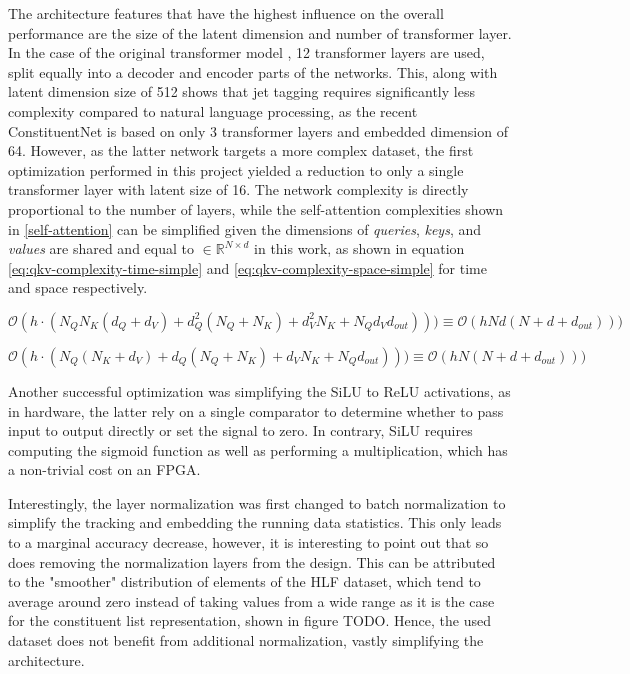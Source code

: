 The architecture features that have the highest influence on the overall performance are the size of the latent dimension and number of transformer layer. In the case of the original transformer model \cite{44-vaswani2017attention}, 12 transformer layers are used, split equally into a decoder and encoder parts of the networks. This, along with latent dimension size of 512 shows that jet tagging requires significantly less complexity compared to natural language processing, as the recent ConstituentNet \cite{3-yuan2021constituentnet:} is based on only 3 transformer layers and embedded dimension of 64. However, as the latter network targets a more complex dataset, the first optimization performed in this project yielded a reduction to only a single transformer layer with latent size of 16. The network complexity is directly proportional to the number of layers, while the self-attention complexities shown in \cref{self-attention} can be simplified given the dimensions of \textit{queries}, \textit{keys}, and \textit{values} are shared and equal to \(\in \mathbb{R}^{N \times d}\) in this work, 
as shown in equation \ref{eq:qkv-complexity-time-simple} and \ref{eq:qkv-complexity-space-simple} for time and space respectively.

\begin{equation}\label{eq:qkv-complexity-time-simple}
  \mathcal{O}(h \cdot (N_Q N_K (d_Q + d_V) + d_Q^2 (N_Q + N_K) + d_V^2 N_K + N_Q d_V d_{out}) )) \equiv
  \mathcal{O}(h N d (N + d + d_{out}) ))
\end{equation}

\begin{equation}\label{eq:qkv-complexity-space-simple}
  \mathcal{O}(h \cdot (N_Q (N_K + d_V) + d_Q (N_Q + N_K) + d_V N_K + N_Q d_{out}) )) \equiv
  \mathcal{O}(h N (N + d + d_{out}) ))
\end{equation}

Another successful optimization was simplifying the SiLU to ReLU activations, as in hardware, the latter rely on a single comparator to determine whether to pass input to output directly or set the signal to zero. In contrary, SiLU requires computing the sigmoid function as well as performing a multiplication, which has a non-trivial cost on an FPGA.

Interestingly, the layer normalization was first changed to batch normalization to simplify the tracking and embedding the running data statistics. This only leads to a marginal accuracy decrease, however, it is interesting to point out that so does removing the normalization layers from the design. This can be attributed to the "smoother" distribution of elements of the HLF dataset, which tend to average around zero instead of taking values from a wide range as it is the case for the constituent list representation, shown in figure TODO. Hence, the used dataset does not benefit from additional normalization, vastly simplifying the architecture.

